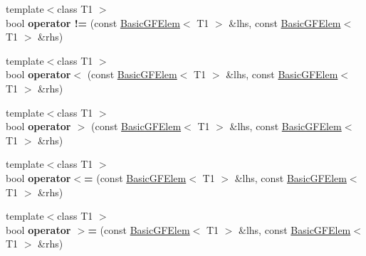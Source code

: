 \begin{DoxyCompactItemize}
\item 
\mbox{\label{class_g_flinalg_1_1_basic_g_f_elem_a49d897c4ca4c2a9565389e1651aac90c}} 
{\footnotesize template$<$class T1 $>$ }\\bool {\bfseries operator !=} (const \mbox{\hyperlink{class_g_flinalg_1_1_basic_g_f_elem}{Basic\+G\+F\+Elem}}$<$ T1 $>$ \&lhs, const \mbox{\hyperlink{class_g_flinalg_1_1_basic_g_f_elem}{Basic\+G\+F\+Elem}}$<$ T1 $>$ \&rhs)
\item 
\mbox{\label{class_g_flinalg_1_1_basic_g_f_elem_a2875e5087a017d7631db5d2364d35e66}} 
{\footnotesize template$<$class T1 $>$ }\\bool {\bfseries operator$<$} (const \mbox{\hyperlink{class_g_flinalg_1_1_basic_g_f_elem}{Basic\+G\+F\+Elem}}$<$ T1 $>$ \&lhs, const \mbox{\hyperlink{class_g_flinalg_1_1_basic_g_f_elem}{Basic\+G\+F\+Elem}}$<$ T1 $>$ \&rhs)
\item 
\mbox{\label{class_g_flinalg_1_1_basic_g_f_elem_af719a06e6ced85f73e3991fecaf8f0cb}} 
{\footnotesize template$<$class T1 $>$ }\\bool {\bfseries operator $>$} (const \mbox{\hyperlink{class_g_flinalg_1_1_basic_g_f_elem}{Basic\+G\+F\+Elem}}$<$ T1 $>$ \&lhs, const \mbox{\hyperlink{class_g_flinalg_1_1_basic_g_f_elem}{Basic\+G\+F\+Elem}}$<$ T1 $>$ \&rhs)
\item 
\mbox{\label{class_g_flinalg_1_1_basic_g_f_elem_ae91de4634ec813b95ffe3a23b47a8dd4}} 
{\footnotesize template$<$class T1 $>$ }\\bool {\bfseries operator$<$=} (const \mbox{\hyperlink{class_g_flinalg_1_1_basic_g_f_elem}{Basic\+G\+F\+Elem}}$<$ T1 $>$ \&lhs, const \mbox{\hyperlink{class_g_flinalg_1_1_basic_g_f_elem}{Basic\+G\+F\+Elem}}$<$ T1 $>$ \&rhs)
\item 
\mbox{\label{class_g_flinalg_1_1_basic_g_f_elem_a83c902be2c205a8500c6407df7db79c7}} 
{\footnotesize template$<$class T1 $>$ }\\bool {\bfseries operator $>$=} (const \mbox{\hyperlink{class_g_flinalg_1_1_basic_g_f_elem}{Basic\+G\+F\+Elem}}$<$ T1 $>$ \&lhs, const \mbox{\hyperlink{class_g_flinalg_1_1_basic_g_f_elem}{Basic\+G\+F\+Elem}}$<$ T1 $>$ \&rhs)
\end{DoxyCompactItemize}


